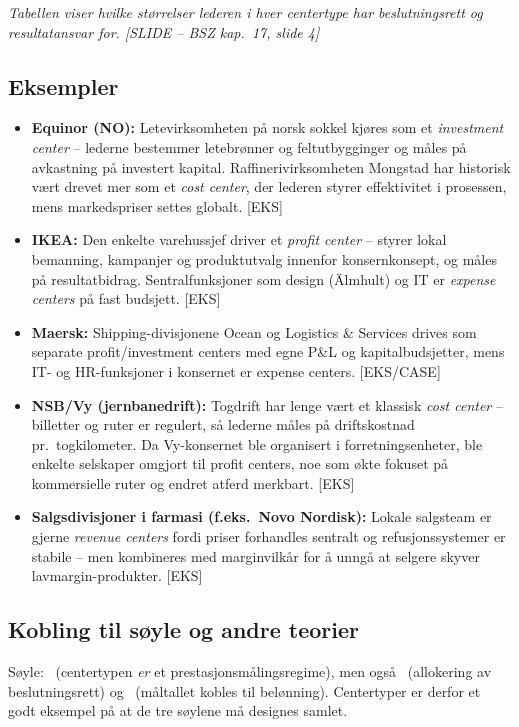 \textit{Tabellen viser hvilke størrelser lederen i hver centertype har beslutningsrett og resultatansvar for. [SLIDE -- BSZ kap.\ 17, slide 4]}

\subsection*{Eksempler}
\begin{itemize}
\item \textbf{Equinor (NO):} Letevirksomheten på norsk sokkel kjøres som et \emph{investment center} -- lederne bestemmer letebrønner og felt\-utbygginger og måles på avkastning på investert kapital. Raffinerivirksomheten Mongstad har historisk vært drevet mer som et \emph{cost center}, der lederen styrer effektivitet i prosessen, mens markedspriser settes globalt. [EKS]
\item \textbf{IKEA:} Den enkelte varehussjef driver et \emph{profit center} -- styrer lokal bemanning, kampanjer og produktutvalg innenfor konsernkonsept, og måles på resultatbidrag. Sentralfunksjoner som design (Älmhult) og IT er \emph{expense centers} på fast budsjett. [EKS]
\item \textbf{Maersk:} Shipping-divisjonene Ocean og Logistics \& Services drives som separate profit/investment centers med egne P\&L og kapitalbudsjetter, mens IT- og HR-funksjoner i konsernet er expense centers. [EKS/CASE]
\item \textbf{NSB/Vy (jernbanedrift):} Togdrift har lenge vært et klassisk \emph{cost center} -- billetter og ruter er regulert, så lederne måles på driftskostnad pr.\ togkilometer. Da Vy-konsernet ble organisert i forretningsenheter, ble enkelte selskaper omgjort til profit centers, noe som økte fokuset på kommersielle ruter og endret atferd merkbart. [EKS]
\item \textbf{Salgsdivisjoner i farmasi (f.eks.\ Novo Nordisk):} Lokale salgsteam er gjerne \emph{revenue centers} fordi priser forhandles sentralt og refusjonssystemer er stabile -- men kombineres med marginvilkår for å unngå at selgere skyver lavmargin-produkter. [EKS]
\end{itemize}

\subsection*{Kobling til søyle og andre teorier}
Søyle: \STwo\ (centertypen \emph{er} et prestasjonsmålingsregime), men også \SOne\ (allokering av beslutningsrett) og \SThree\ (måltallet kobles til belønning). Centertyper er derfor et godt eksempel på at de tre søylene må designes samlet.

